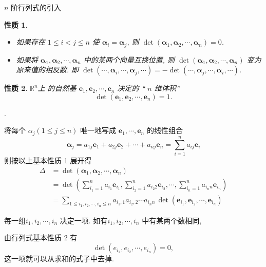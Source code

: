 \documentclass[10pt,punct]{ctexbeamer}
\newtheorem{pr3}{性质}
\begin{document}
\begin{frame}{$n$ 阶行列式的引入}
    \begin{pr3}
        \begin{itemize}
        \item 如果存在 $1 \leqslant i<j \leqslant n$ 使 $\boldsymbol{\alpha}_i=\boldsymbol{\alpha}_j$, 则 $\operatorname{det}\left(\boldsymbol{\alpha}_1, \boldsymbol{\alpha}_2, \cdots, \boldsymbol{\alpha}_n\right)=0$.

       \item  如果将 $\boldsymbol{\alpha}_1, \boldsymbol{\alpha}_2, \cdots, \boldsymbol{\alpha}_n$ 中的某两个向量互换位置, 则 $\operatorname{det}\left(\boldsymbol{\alpha}_1, \boldsymbol{\alpha}_2, \cdots, \boldsymbol{\alpha}_n\right)$ 变为 原来值的相反数. 即
        $\operatorname{det}\left(\cdots, \boldsymbol{\alpha}_i, \cdots, \boldsymbol{\alpha}_j, \cdots\right)=-\operatorname{det}\left(\cdots, \boldsymbol{\alpha}_j, \cdots, \boldsymbol{\alpha}_i, \cdots\right)$.
        \end{itemize}
    \end{pr3}



    \begin{pr3}
        $\mathbb{R}^n$上 的自然基 $\boldsymbol{e}_1, \boldsymbol{e}_2, \cdots, \boldsymbol{e}_n$ 决定的 “ $n$ 维体积” $$\operatorname{det}\left( \boldsymbol{e}_1, \boldsymbol{e}_2, \cdots, \boldsymbol{e}_n\right)=1.$$
    \end{pr3}.
\end{frame}


\begin{frame}
    将每个 $\alpha_j(1 \leqslant j \leqslant n)$ 唯一地写成 $\boldsymbol{e}_1, \cdots, \boldsymbol{e}_n$ 的线性组合
    $$
    \boldsymbol{\alpha}_j=a_{1 j} \boldsymbol{e}_1+a_{2 j} \boldsymbol{e}_2+\cdots+a_{n j} \boldsymbol{e}_n=\sum_{i=1}^n a_{i j} \boldsymbol{e}_i
    $$
    则按以上基本性质 1 展开得
    $$
    \begin{aligned}
        \Delta &=\operatorname{det}\left(\boldsymbol{\alpha}_1, \boldsymbol{\alpha}_2, \cdots, \boldsymbol{\alpha}_n\right) \\
        &=\operatorname{det}\left(\sum_{i_1=1}^n a_{i_1} \boldsymbol{e}_{i_1}, \sum_{i_2=1}^n a_{i_2 2} \boldsymbol{e}_{i_2}, \cdots, \sum_{i_n=1}^n a_{i_n n} \boldsymbol{e}_{i_n}\right) \\
        &=\sum_{1 \leqslant i_1, i_2, \cdots, i_n \leqslant n} a_{i_1, 1} a_{i_2, 2} \cdots a_{i_n n} \, \operatorname{det}\left(\boldsymbol{e}_{i_1}, \boldsymbol{e}_{i_2}, \cdots, \boldsymbol{e}_{i_n}\right)
    \end{aligned}
    $$

    每一组$i_1, i_2, \cdots, i_n$ 决定一项.
    如有$i_1, i_2, \cdots, i_n$ 中有某两个数相同,

    由行列式基本性质 2 有 $$\operatorname{det}\left(e_{i_1}, e_{i_2}, \cdots, e_{i_n}\right)=0,$$
    这一项就可以从求和的式子中去掉.
\end{frame}
\end{document}
